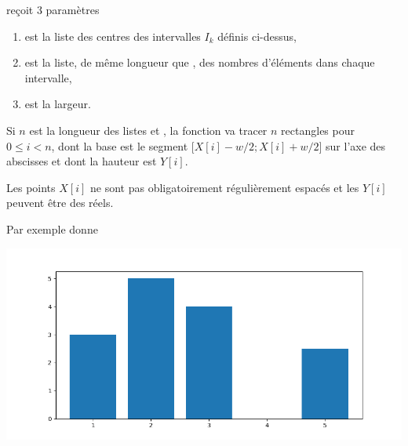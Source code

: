  reçoit 3 paramètres 
\begin{enumerate}
    \item {} est la liste des centres des intervalles $I_k$ définis ci-dessus,
    \item {} est la liste, de même longueur que , des nombres d'éléments dans chaque intervalle,
    \item {} est la largeur.
\end{enumerate}
Si $n$ est la longueur des listes  et , la fonction va tracer $n$ rectangles pour $0\le i < n$, dont la base est le segment $\bigl[X[i] - w/2; X[i] + w/2\bigr]$ sur l'axe des abscisses et dont
la hauteur est $Y[i]$.

Les points $X[i]$ ne sont pas obligatoirement régulièrement espacés et les $Y[i]$ peuvent être des réels.

Par exemple  donne
\begin{center}
\includegraphics[scale=0.4]{TP/Images/TP17_histo1.png}
\end{center}

